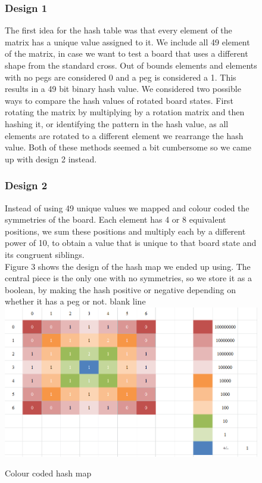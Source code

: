 \documentclass[11pt]{article}
\begin{document}
\begin{figure}
\subsubsection*{Design 1}
The first idea for the hash table was that every element of the matrix has a unique value assigned to it. We include all 49 element of the matrix, in case we want to test a board that uses a different shape from the standard cross. Out of bounds elements and elements with no pegs are considered 0 and a peg is considered a 1. This results in a 49 bit binary hash value. We considered two possible ways to compare the hash values of rotated board states. First rotating the matrix by multiplying by a rotation matrix and then hashing it, or identifying the pattern in the hash value, as all elements are rotated to a different element we rearrange the hash value.
Both of these methods seemed a bit cumbersome so we came up with design 2 instead.
\subsubsection*{Design 2}
Instead of using 49 unique values we mapped and colour coded the symmetries of the board. Each element has 4 or 8 equivalent positions, we sum these positions and multiply each by a different power of 10, to obtain a value that is unique to that board state and its congruent siblings.\\
Figure 3 shows the design of the hash map we ended up using. The central piece is the only one with no symmetries, so we store it as a boolean, by making the hash positive or negative depending on whether it has a peg or not.
\newline
\color{white} blank line\\
\color{black}
\includegraphics[width=\textwidth]{4}
\caption{Colour coded hash map} 
\label{fig: 3}
\end{figure}
\newpage
\end{document}
